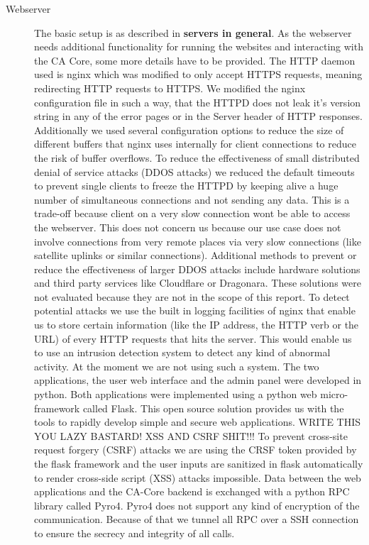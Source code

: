 \documentclass[a4paper, toc=index, 12pt, DIV14, twoside, BCOR2cm, headsepline, numbers=noenddot, bibliography=totoc]{scrbook}
\begin{document}
\begin{description}
\item[Webserver ] The basic setup is as described in {\bfseries servers in general}. As the webserver needs additional functionality for running the websites and interacting with the CA Core, some more details have to be provided.\newline
The HTTP daemon used is nginx which was modified to only accept HTTPS requests, meaning redirecting HTTP requests to HTTPS.\newline
We modified the nginx configuration file in such a way, that the HTTPD does not leak it's version string in any of the error pages or in the Server header of HTTP responses. Additionally we used several configuration options to reduce the size of different buffers that nginx uses internally for client connections to reduce the risk of buffer overflows.\newline
To reduce the effectiveness of small distributed denial of service attacks (DDOS attacks) we reduced the default timeouts to prevent single clients to freeze the HTTPD by keeping alive a huge number of simultaneous connections and not sending any data. This is a trade-off because client on a very slow connection wont be able to access the webserver. This does not concern us because our use case does not involve connections from very remote places via very slow connections (like satellite uplinks or similar connections). Additional methods to prevent or reduce the effectiveness of larger DDOS attacks include hardware solutions and third party services like Cloudflare or Dragonara. These solutions were not evaluated because they are not in the scope of this report.\newline
To detect potential attacks we use the built in logging facilities of nginx that enable us to store certain information (like the IP address, the HTTP verb or the URL) of every HTTP requests that hits the server. This would enable us to use an intrusion detection system to detect any kind of abnormal activity. At the moment we are not using such a system.\newline
The two applications, the user web interface and the admin panel were developed in python. Both applications were implemented using a python web micro-framework called Flask. This open source solution provides us with the tools to rapidly develop simple and secure web applications. WRITE THIS YOU LAZY BASTARD! XSS AND CSRF SHIT!!!\newline
To prevent cross-site request forgery (CSRF) attacks we are using the CRSF token provided by the flask framework and the user inputs are sanitized in flask automatically to render cross-side script (XSS) attacks impossible.\newline
Data between the web applications and the CA-Core backend is exchanged with a python RPC library called Pyro4. Pyro4 does not support any kind of encryption of the communication. Because of that we tunnel all RPC over a SSH connection to ensure the secrecy and integrity of all calls.


\end{description}
\end{document}
